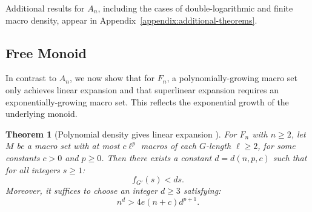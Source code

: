 \documentclass[12pt]{amsart}
\newtheorem{theorem}{Theorem}
\theoremstyle{definition}
\theoremstyle{remark}
\begin{document}
Additional results for $A_n$, including the cases of double-logarithmic and finite macro density, appear in Appendix~\ref{appendix:additional-theorems}.

\subsection{Free Monoid}

In contrast to $A_n$, we now show that for $F_n$, a polynomially-growing macro set only achieves linear expansion and that superlinear expansion requires an exponentially-growing macro set. 
This reflects the exponential growth of the underlying monoid.

\begin{theorem}[Polynomial density gives linear expansion ]\label{thm:free-polynomial}
For $F_n$ with $n \geq 2$, let $M$ be a macro set with at most $c\ell^p$ macros of each $G$-length $\ell \geq 2$, for some constants $c > 0$ and $p \geq 0$.
Then there exists a constant $d = d(n,p,c)$ such that for all integers $s \geq 1$:
\[
f_{G'}(s) < ds.
\]
Moreover, it suffices to choose an integer $d \geq 3$ satisfying:
\begin{equation}\label{eq:free-condition2}
n^d > 4e (n + c) d^{p+1}.
\end{equation}
\end{theorem}
\end{document}

